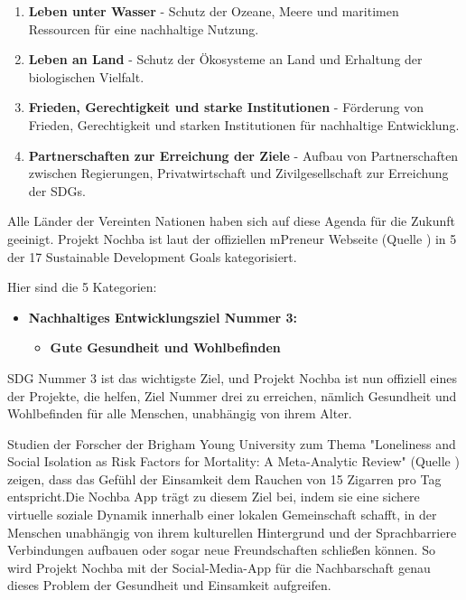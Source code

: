 \begin{enumerate}
\item \textbf{Leben unter Wasser} - Schutz der Ozeane, Meere und maritimen Ressourcen für eine nachhaltige Nutzung.
\item \textbf{Leben an Land} - Schutz der Ökosysteme an Land und Erhaltung der biologischen Vielfalt.
\item \textbf{Frieden, Gerechtigkeit und starke Institutionen} - Förderung von Frieden, Gerechtigkeit und starken Institutionen für nachhaltige Entwicklung.
\item \textbf{Partnerschaften zur Erreichung der Ziele} - Aufbau von Partnerschaften zwischen Regierungen, Privatwirtschaft und Zivilgesellschaft zur Erreichung der SDGs.
\end{enumerate}


Alle Länder der Vereinten Nationen haben sich auf diese Agenda für die Zukunft geeinigt. Projekt Nochba ist laut der offiziellen mPreneur Webseite (Quelle \cite{mPreneur-Website}) in 5 der 17 Sustainable Development Goals kategorisiert. 

Hier sind die 5 Kategorien:

\begin{itemize}
    \item \textbf{Nachhaltiges Entwicklungsziel Nummer 3:}
    \begin{itemize}
        \item \textbf{Gute Gesundheit und Wohlbefinden}
    \end{itemize}
\end{itemize}
        
SDG Nummer 3 ist das wichtigste Ziel, und Projekt Nochba ist nun offiziell eines der Projekte, die helfen, Ziel Nummer drei zu erreichen, nämlich Gesundheit und Wohlbefinden für alle Menschen, unabhängig von ihrem Alter.
        
Studien der Forscher der Brigham Young University zum Thema "Loneliness and Social Isolation as Risk Factors for Mortality: A Meta-Analytic Review" (Quelle \cite{Loneliness-and-Social-Isolation}) zeigen, dass das Gefühl der Einsamkeit dem Rauchen von 15 Zigarren pro Tag entspricht.Die Nochba App trägt zu diesem Ziel bei, indem sie eine sichere virtuelle soziale Dynamik innerhalb einer lokalen Gemeinschaft schafft, in der Menschen unabhängig von ihrem kulturellen Hintergrund und der Sprachbarriere Verbindungen aufbauen oder sogar neue Freundschaften schließen können. So wird Projekt Nochba mit der Social-Media-App für die Nachbarschaft genau dieses Problem der Gesundheit und Einsamkeit aufgreifen.

